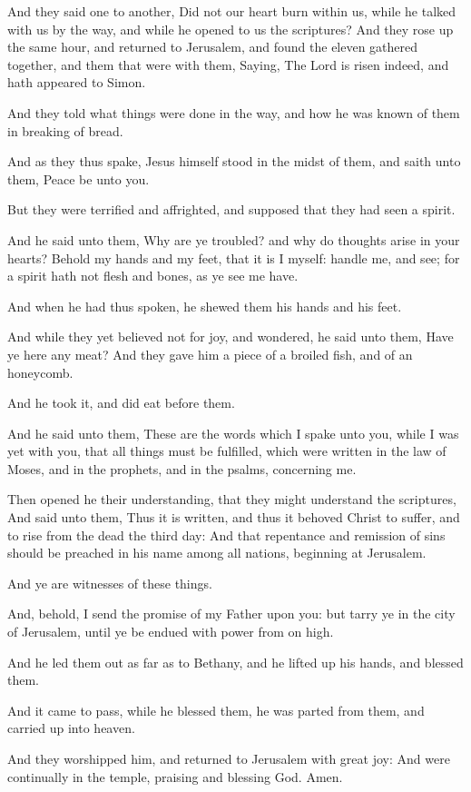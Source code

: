 \verse And they said one to another, Did not our heart burn within us, while he talked with us by the way, and while he opened to us the scriptures?  \verse And they rose up the same hour, and returned to Jerusalem, and found the eleven gathered together, and them that were with them, \verse Saying, The Lord is risen indeed, and hath appeared to Simon.

\verse And they told what things were done in the way, and how he was known of them in breaking of bread.

\verse And as they thus spake, Jesus himself stood in the midst of them, and saith unto them, Peace be unto you.

\verse But they were terrified and affrighted, and supposed that they had seen a spirit.

\verse And he said unto them, Why are ye troubled? and why do thoughts arise in your hearts?  \verse Behold my hands and my feet, that it is I myself: handle me, and see; for a spirit hath not flesh and bones, as ye see me have.

\verse And when he had thus spoken, he shewed them his hands and his feet.

\verse And while they yet believed not for joy, and wondered, he said unto them, Have ye here any meat?  \verse And they gave him a piece of a broiled fish, and of an honeycomb.

\verse And he took it, and did eat before them.

\verse And he said unto them, These are the words which I spake unto you, while I was yet with you, that all things must be fulfilled, which were written in the law of Moses, and in the prophets, and in the psalms, concerning me.

\verse Then opened he their understanding, that they might understand the scriptures, \verse And said unto them, Thus it is written, and thus it behoved Christ to suffer, and to rise from the dead the third day: \verse And that repentance and remission of sins should be preached in his name among all nations, beginning at Jerusalem.

\verse And ye are witnesses of these things.

\verse And, behold, I send the promise of my Father upon you: but tarry ye in the city of Jerusalem, until ye be endued with power from on high.

\verse And he led them out as far as to Bethany, and he lifted up his hands, and blessed them.

\verse And it came to pass, while he blessed them, he was parted from them, and carried up into heaven.

\verse And they worshipped him, and returned to Jerusalem with great joy: \verse And were continually in the temple, praising and blessing God. Amen.

